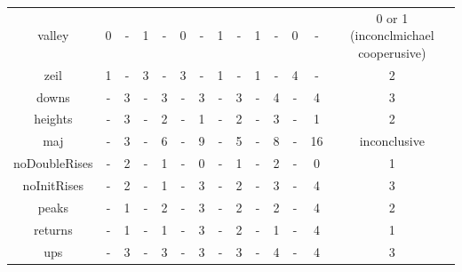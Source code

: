 \documentclass[12pt]{article}
\begin{document}
\begin{table}[H]
\begin{tabular}{c | c c c c c c c c c c c c | c}
valley & 0 & - & 1 & - & 0 & - & 1 & - & 1 & - & 0 & - & 0 or 1 (inconclmichael cooperusive)\\
zeil & 1 & - & 3 & - & 3 & - & 1 & - & 1 & - & 4 & - & 2\\
\hline
downs & - & 3 & - & 3 & - & 3 & - & 3 & - & 4 & - & 4 & 3\\
heights & - & 3 & - & 2 & - & 1 & - & 2 & - & 3 & - & 1 & 2\\
maj & - & 3 & - & 6 & - & 9 & - & 5 & - & 8 & - & 16 & inconclusive\\
noDoubleRises & - & 2 & - & 1 & - & 0 & - & 1 & - & 2 & - & 0 & 1\\
noInitRises & - & 2 & - & 1 & - & 3 & - & 2 & - & 3 & - & 4 & 3\\
peaks & - & 1 & - & 2 & - & 3 & - & 2 & - & 2 & - & 4 & 2\\
returns & - & 1 & - & 1 & - & 3 & - & 2 & - & 1 & - & 4 & 1\\
ups & - & 3 & - & 3 & - & 3 & - & 3 & - & 4 & - & 4 & 3\\
\hline
\end{tabular}
\label{table:StandardPerms1}
\end{table}
\end{document}
